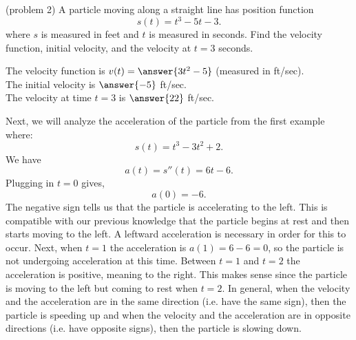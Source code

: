 \documentclass[handout]{ximera}
\begin{document}
\begin{example}[example 2]
\begin{center}
\end{center}


\begin{center}
\end{center}


\end{example}



\begin{problem}(problem 2)
A particle moving along a straight line has position function
\[s(t) = t^3 - 5t -3.\]
where $s$ is measured in feet and $t$ is measured in seconds.
Find the velocity function, initial velocity, and the velocity at $t = 3$ seconds.

The velocity function is $v(t) = \answer{3t^2 -5}$ (measured in ft/sec).\\
The initial velocity is $\answer{-5}$ ft/sec.\\
The velocity at time $t=3$ is $\answer{22}$ ft/sec.\\


\end{problem}

 

\begin{example}[example 3]
Next, we will analyze the acceleration of the particle from the first example where:
\[s(t) = t^3 - 3t^2 + 2.\]
We have
\[a(t) = s''(t) = 6t -6.\]
Plugging in $t=0$ gives,
\[a(0) = -6.\]
The negative sign tells us that the particle is accelerating to the left. 
This is compatible with our previous knowledge that the particle begins at rest and then starts moving to the left. 
A leftward acceleration is necessary in order for this to occur.
Next, when $t=1$ the acceleration is $a(1) = 6-6 = 0$, so the particle is not undergoing acceleration at this time.
Between $t=1$ and $t = 2$ the acceleration is positive, meaning to the right. 
This makes sense since the particle is moving to the left but coming to rest when $t = 2$.
In general, when the velocity and the acceleration are in the same direction (i.e. have the same sign), 
then the particle is speeding up and when
the velocity and the acceleration are in opposite directions (i.e. have opposite signs),  then the particle is slowing down.
\end{example}
\end{document}
